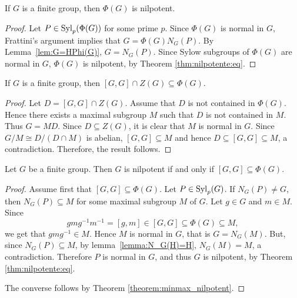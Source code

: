 \begin{theorem}[Frattini]
	\label{theorem:Frattini}
	If $G$ is a finite group, then $\Phi(G)$ is nilpotent. 
\end{theorem}

\begin{proof}
	Let $P\in\mathrm{Syl}_p(\Phi(G))$ for some prime $p$. Since $\Phi(G)$ is normal in
	$G$, Frattini's argument implies that 
	$G=\Phi(G)N_G(P)$. By Lemma~\ref{lem:G=HPhi(G)},
	$G=N_G(P)$. Since Sylow subgroups of $\Phi(G)$ are normal in $G$,
	$\Phi(G)$ is nilpotent, by Theorem \ref{thm:nilpotente:eq}.
\end{proof}



\begin{theorem}
	\label{thm:Gaschutz}
	If $G$ is a finite group, then $[G,G]\cap Z(G)\subseteq\Phi(G)$.
\end{theorem}

\begin{proof}
	Let $D=[G,G]\cap Z(G)$. Assume that $D$ is not contained in $\Phi(G)$.
	Hence there exists a maximal subgroup $M$ 
	such that $D$ is not contained in $M$. Thus $G=MD$. Since $D\subseteq Z(G)$, it is clear that $M$ is normal in $G$.
	Since $G/M\cong D/(D\cap M)$ is abelian,  $[G,G]\subseteq M$ and hence 
	$D\subseteq [G,G]\subseteq M$, a contradiction. Therefore, the result follows.
\end{proof}


\begin{theorem}[Wielandt]
	\label{theorem:Wielandt}
	Let $G$ be a finite group. Then $G$ is nilpotent if and only if
	$[G,G]\subseteq\Phi(G)$.
\end{theorem}

\begin{proof}
	Assume first that $[G,G]\subseteq\Phi(G)$. Let $P\in\mathrm{Syl}_p(G)$. If $N_G(P)\ne
	G$, then $N_G(P)\subseteq M$ for some maximal subgroup $M$ of $G$. Let
	$g\in G$ and $m\in M$. Since 
	\[
		gmg^{-1}m^{-1}=[g,m]\in [G,G]\subseteq\Phi(G)\subseteq M,
	\]
	we get that $gmg^{-1}\in M$. Hence $M$ is normal in $G$, that is $G=N_G(M)$. But, since $N_G(P)\subseteq M$, by
	lemma~\ref{lemma:N_G(H)=H}, $N_G(M)=M$, a contradiction. Therefore $P$ is normal in $G$, and thus $G$ is nilpotent, by Theorem \ref{thm:nilpotente:eq}.
	
	The converse follows by Theorem \ref{theorem:minmax_nilpotent}.
\end{proof}

